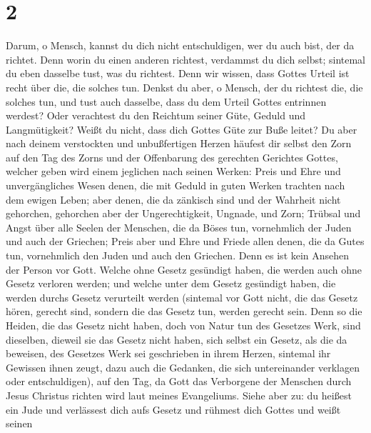 \hypertarget{section-1}{%
\section{2}\label{section-1}}

 Darum, o Mensch, kannst du dich nicht entschuldigen, wer
du auch bist, der da richtet. Denn worin du einen anderen richtest,
verdammst du dich selbst; sintemal du eben dasselbe tust, was du
richtest.  Denn wir wissen, dass Gottes Urteil ist recht
über die, die solches tun.  Denkst du aber, o Mensch, der
du richtest die, die solches tun, und tust auch dasselbe, dass du dem
Urteil Gottes entrinnen werdest?  Oder verachtest du den
Reichtum seiner Güte, Geduld und Langmütigkeit? Weißt du nicht, dass
dich Gottes Güte zur Buße leitet?  Du aber nach deinem
verstockten und unbußfertigen Herzen häufest dir selbst den Zorn auf den
Tag des Zorns und der Offenbarung des gerechten Gerichtes Gottes,
 welcher geben wird einem jeglichen nach seinen Werken:
 Preis und Ehre und unvergängliches Wesen denen, die mit
Geduld in guten Werken trachten nach dem ewigen Leben; 
aber denen, die da zänkisch sind und der Wahrheit nicht gehorchen,
gehorchen aber der Ungerechtigkeit, Ungnade, und Zorn; 
Trübsal und Angst über alle Seelen der Menschen, die da Böses tun,
vornehmlich der Juden und auch der Griechen;  Preis aber
und Ehre und Friede allen denen, die da Gutes tun, vornehmlich den Juden
und auch den Griechen.  Denn es ist kein Ansehen der
Person vor Gott.  Welche ohne Gesetz gesündigt haben, die
werden auch ohne Gesetz verloren werden; und welche unter dem Gesetz
gesündigt haben, die werden durchs Gesetz verurteilt werden
 (sintemal vor Gott nicht, die das Gesetz hören, gerecht
sind, sondern die das Gesetz tun, werden gerecht sein. 
Denn so die Heiden, die das Gesetz nicht haben, doch von Natur tun des
Gesetzes Werk, sind dieselben, dieweil sie das Gesetz nicht haben, sich
selbst ein Gesetz,  als die da beweisen, des Gesetzes
Werk sei geschrieben in ihrem Herzen, sintemal ihr Gewissen ihnen zeugt,
dazu auch die Gedanken, die sich untereinander verklagen oder
entschuldigen),  auf den Tag, da Gott das Verborgene der
Menschen durch Jesus Christus richten wird laut meines Evangeliums.
 Siehe aber zu: du heißest ein Jude und verlässest dich
aufs Gesetz und rühmest dich Gottes  und weißt seinen
